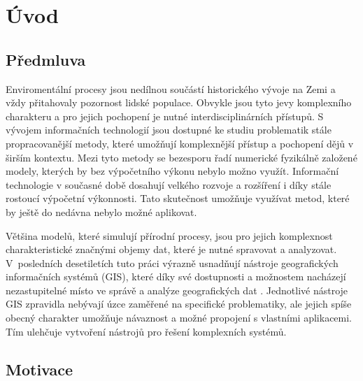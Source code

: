 \documentclass[a4paper,12pt,oneside]{report}
\newcommand{\necislovana}[1]{%
\phantomsection
\addcontentsline{toc}{section}{#1}
\section*{#1}
\markboth{\uppercase{#1}}{}
}
\begin{document}
\newpage

\newpage

\tableofcontents


\newpage
\necislovana{Úvod}

\pagestyle{fancy}
\fancyhf{}
\renewcommand{\sectionmark}[1]{\markboth{#1}{}} %
{}
\fancyhead[R]{\leftmark} %
\fancyfoot[C]{\thepage}


\setcounter{page}{1}
\subsection*{Předmluva}


Enviromentální procesy jsou nedílnou součástí historického vývoje na
Zemi a vždy přitahovaly pozornost lidské populace. Obvykle jsou tyto
jevy komplexního charakteru a pro jejich pochopení je nutné
interdisciplinárních přístupů. S vývojem informačních technologií jsou
dostupné ke studiu problematik stále propracovanější metody, které
umožňují komplexnější přístup a pochopení dějů v širším kontextu. Mezi
tyto metody se bezesporu řadí numerické fyzikálně založené modely, kterých by
bez výpočetního výkonu nebylo možno využít. Informační technologie v
současné době dosahují velkého rozvoje a rozšíření i díky stále
rostoucí výpočetní výkonnosti. Tato skutečnost umožňuje využívat
metod, které by ještě do nedávna nebylo možné aplikovat.

Většina modelů, které simulují přírodní procesy, jsou pro jejich
komplexnost charakteristické značnými objemy dat, které je nutné
spravovat a analyzovat. V~posle\-dních desetiletích tuto práci výrazně
usnadňují nástroje geografických informačních systémů (GIS),
které díky své dostupnosti a možnostem nacházejí nezastupitelné místo
ve správě a analýze geografických dat \cite{coppock}.
Jednotlivé nástroje GIS zpravidla nebývají
úzce zaměřené na specifické problematiky, ale jejich spíše obecný
charakter umožňuje návaznost a možné propojení s vlastními aplikacemi.
Tím ulehčuje vytvoření nástrojů pro řešení komplexních systémů.

\subsection*{Motivace}
\end{document}
